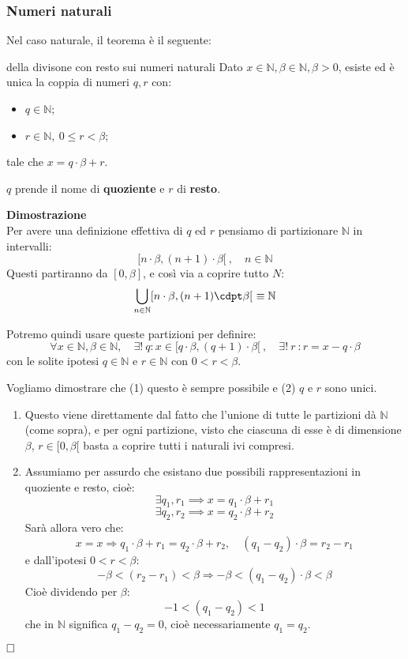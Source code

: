 \documentclass[a4paper,11pt]{article}
\begin{document}
\subsubsection{Numeri naturali}
Nel caso naturale, il teorema è il seguente:
\begin{theorem}{della divisone con resto sui numeri naturali}
	Dato $x \in \mathbb{N}, \beta \in \mathbb{N}, \beta > 0$, esiste ed è unica la coppia di numeri $q,r$ con:
	\begin{itemize}
		\item $q \in \mathbb{N}$;
		\item $r \in \mathbb{N}, \ 0 \leq r < \beta$;
	\end{itemize}
	tale che $x = q \cdot \beta + r$.
\end{theorem}
$q$ prende il nome di \textbf{quoziente} e $r$ di \textbf{resto}.

\par\medskip
\noindent
\textbf{\textsf{Dimostrazione}} \\
Per avere una definizione effettiva di $q$ ed $r$ pensiamo di partizionare  $\mathbb{N}$ in intervalli:
$$
[n \cdot \beta, (n+1) \cdot \beta[ \ , \quad n \in \mathbb{N}
$$
Questi partiranno da $[0, \beta]$, e così via a coprire tutto $N$:
$$
\bigcup_{n \in \mathbb{N}} [n \cdot \beta, (n+1) \cdpt \beta[ \ \equiv \mathbb{N}
$$

Potremo quindi usare queste partizioni per definire:
$$ \forall x \in \mathbb{N}, \beta \in \mathbb{N}, \quad \exists ! \ q : x \in [ q \cdot \beta, (q+1) \cdot \beta [ \ , \quad \exists ! \ r \ : r = x - q \cdot \beta $$
con le solite ipotesi $q \in \mathbb{N}$ e $r \in \mathbb{N}$ con $0 < r < \beta$.

Vogliamo dimostrare che (1) questo è sempre possibile e (2) $q$ e $r$ sono unici.
\begin{enumerate}
	\item Questo viene direttamente dal fatto che l'unione di tutte le partizioni dà $\mathbb{N}$ (come sopra), e per ogni partizione, visto che ciascuna di esse è di dimensione $\beta$, $r \in [0, \beta[$ basta a coprire tutti i naturali ivi compresi.
	\item Assumiamo per assurdo che esistano due possibili rappresentazioni in quoziente e resto, cioè:
		$$
		\exists q_1, r_1 \implies x = q_1 \cdot \beta + r_1
		$$
		$$
		\exists q_2, r_2 \implies x = q_2 \cdot \beta + r_2
		$$
		Sarà allora vero che:
		$$
		x = x \Rightarrow  q_1 \cdot \beta + r_1 = 	q_2 \cdot \beta + r_2, \quad (q_1 - q_2) \cdot \beta = r_2 - r_1 $$
		e dall'ipotesi $0 < r < \beta$:
		$$ -\beta < (r_2 - r_1) < \beta \Rightarrow -\beta < (q_1 - q_2) \cdot \beta < \beta $$
		Cioè dividendo per $\beta$:
		$$ -1 < (q_1 - q_2) < 1 $$
		che in $\mathbb{N}$ significa $q_1 - q_2 = 0$, cioè necessariamente $q_1 = q_2$. 
\end{enumerate}
$\hfill\square$
\end{document}
